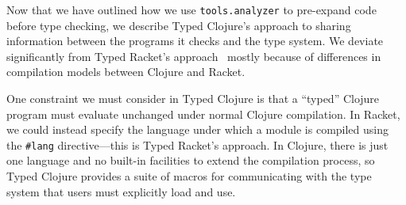 
Now that we have outlined how we use \texttt{tools.analyzer} to pre-expand code before type checking,
we describe Typed Clojure's approach to sharing information between the programs it checks
and the type system.
We deviate significantly from Typed Racket's approach~\cite{Culpepper07advancedmacrology}
mostly because of differences in compilation models between Clojure and Racket.

One constraint we must consider in Typed Clojure is that a ``typed'' Clojure program must
evaluate unchanged under normal Clojure compilation. In Racket, we could instead specify
the language under which a module is compiled using the \texttt{\#lang} directive---this is Typed
Racket's approach. 
In Clojure, there is just one language and no built-in facilities to extend the compilation
process, so Typed Clojure provides a suite of macros for communicating with the type system that
users must explicitly load and use.

